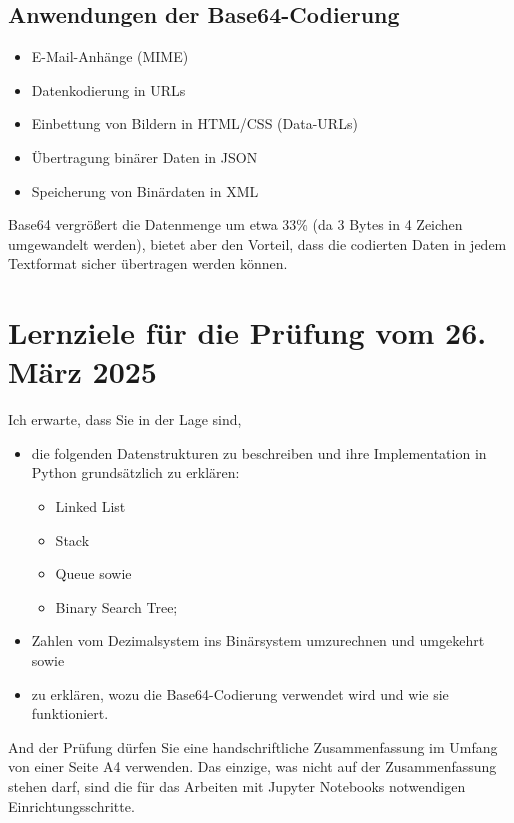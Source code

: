\documentclass[
  nswissgerman,
  a4paper,
  DIV=11,
  numbers=noendperiod,
  ngerman]{scrreprt}
\providecommand{\tightlist}{%
  \setlength{\itemsep}{0pt}\setlength{\parskip}{0pt}}
\begin{document}
\section{Anwendungen der
Base64-Codierung}\label{anwendungen-der-base64-codierung}

\begin{itemize}
\tightlist
\item
  E-Mail-Anhänge (MIME)
\item
  Datenkodierung in URLs
\item
  Einbettung von Bildern in HTML/CSS (Data-URLs)
\item
  Übertragung binärer Daten in JSON
\item
  Speicherung von Binärdaten in XML
\end{itemize}

Base64 vergrößert die Datenmenge um etwa 33\% (da 3 Bytes in 4 Zeichen
umgewandelt werden), bietet aber den Vorteil, dass die codierten Daten
in jedem Textformat sicher übertragen werden können.

\chapter{Lernziele für die Prüfung vom 26. März
2025}\label{lernziele-fuxfcr-die-pruxfcfung-vom-26.-muxe4rz-2025}

Ich erwarte, dass Sie in der Lage sind,

\begin{itemize}
\tightlist
\item
  die folgenden Datenstrukturen zu beschreiben und ihre Implementation
  in Python grundsätzlich zu erklären:

  \begin{itemize}
  \tightlist
  \item
    Linked List
  \item
    Stack
  \item
    Queue sowie
  \item
    Binary Search Tree;
  \end{itemize}
\item
  Zahlen vom Dezimalsystem ins Binärsystem umzurechnen und umgekehrt
  sowie
\item
  zu erklären, wozu die Base64-Codierung verwendet wird und wie sie
  funktioniert.
\end{itemize}

And der Prüfung dürfen Sie eine handschriftliche Zusammenfassung im
Umfang von einer Seite A4 verwenden. Das einzige, was nicht auf der
Zusammenfassung stehen darf, sind die für das Arbeiten mit Jupyter
Notebooks notwendigen Einrichtungsschritte.
\end{document}
